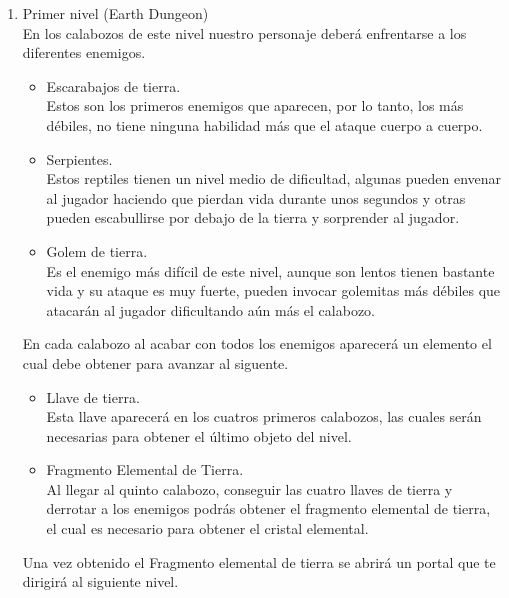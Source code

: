 \documentclass{article}
\begin{document}
\begin{enumerate}
    \item Primer nivel (Earth Dungeon)\\
    En los calabozos de este nivel nuestro personaje deberá enfrentarse a los diferentes enemigos.
    \begin{itemize}
        \item Escarabajos de tierra.\\
        Estos son los primeros enemigos que aparecen, por lo tanto, los más débiles, no tiene ninguna habilidad más que el ataque cuerpo a cuerpo.
        \item Serpientes.\\
        Estos reptiles tienen un nivel medio de dificultad, algunas pueden envenar al jugador haciendo que pierdan vida durante unos segundos y otras pueden escabullirse por debajo de la tierra y sorprender al jugador.
        \item Golem de tierra.\\
        Es el enemigo más difícil de este nivel, aunque son lentos tienen bastante vida y su ataque es muy fuerte, pueden invocar golemitas más débiles que atacarán al jugador dificultando aún más el calabozo.
    \end{itemize}
    En cada calabozo al acabar con todos los enemigos aparecerá un elemento el cual debe obtener para avanzar al siguente.
    \begin{itemize}
        \item Llave de tierra.\\
        Esta llave aparecerá en los cuatros primeros calabozos, las cuales serán necesarias para obtener el último objeto del nivel.
        \item Fragmento Elemental de Tierra.\\
        Al llegar al quinto calabozo, conseguir las cuatro llaves de tierra y derrotar a los enemigos podrás obtener el fragmento elemental de tierra, el cual es necesario para obtener el cristal elemental.
    \end{itemize}
    Una vez obtenido el Fragmento elemental de tierra se abrirá un portal que te dirigirá al siguiente nivel.
    

\end{enumerate}
\end{document}
